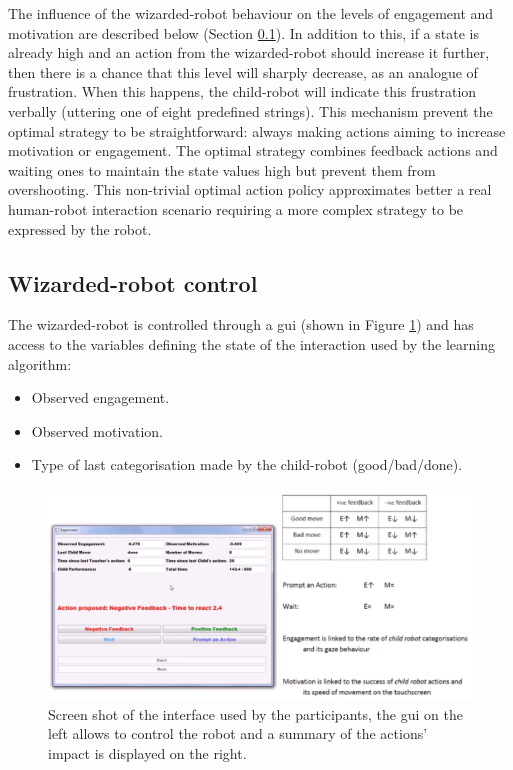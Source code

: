The influence of the wizarded-robot behaviour on the levels of engagement and motivation are described below (Section \ref{ssec:woz_wizarded_robot}). In addition to this, if a state is already high and an action from the wizarded-robot should increase it further, then there is a chance that this level will sharply decrease, as an analogue of frustration. When this happens, the child-robot will indicate this frustration verbally (uttering one of eight predefined strings). This mechanism prevent the optimal strategy to be straightforward: always making actions aiming to increase motivation or engagement. The optimal strategy combines feedback actions and waiting ones to maintain the state values high but prevent them from overshooting. This non-trivial optimal action policy approximates better a real human-robot interaction scenario requiring a more complex strategy to be expressed by the robot.

\subsection{Wizarded-robot control}
\label{ssec:woz_wizarded_robot}
The wizarded-robot is controlled through a \gls{gui} (shown in Figure \ref{fig:woz_gui}) and has access to the variables defining the state of the interaction used by the learning algorithm:
\begin{itemize}
	\item Observed engagement.
	\item Observed motivation.
	\item Type of last categorisation made by the child-robot (good/bad/done).
\end{itemize}

\begin{figure}[ht]
	\centering
	\includegraphics[width=.9\textwidth]{GUI-woz.png}
	\caption{Screen shot of the interface used by the participants, the \gls{gui} on the left allows to control the robot and a summary of the actions' impact is displayed on the right.}
	\label{fig:woz_gui}
\end{figure}

